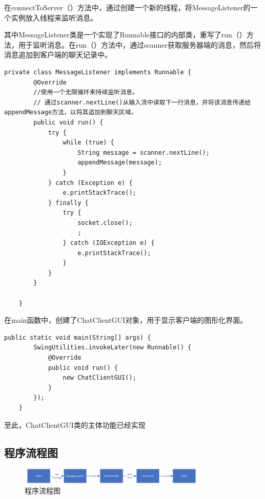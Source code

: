 \documentclass[UTF8,12pt]{article}
\begin{document}
在connectToServer（）方法中，通过创建一个新的线程，将MessageListener的一个实例放入线程来监听消息。

其中MessageListener类是一个实现了Runnable接口的内部类，重写了run（）方法，用于监听消息。在run（）方法中，通过scanner获取服务器端的消息，然后将消息追加到客户端的聊天记录中。
\begin{lstlisting}[title=MessageListener类的实现,frame=shadowbox]
    private class MessageListener implements Runnable {
        @Override
        //使用一个无限循环来持续监听消息。
        // 通过scanner.nextLine()从输入流中读取下一行消息，并将该消息传递给appendMessage方法，以将其追加到聊天区域。
        public void run() {
            try {
                while (true) {
                    String message = scanner.nextLine();
                    appendMessage(message);
                }
            } catch (Exception e) {
                e.printStackTrace();
            } finally {
                try {
                    socket.close();
                    ;
                } catch (IOException e) {
                    e.printStackTrace();
                }
            }
        }

    }

\end{lstlisting}

在main函数中，创建了ChatClientGUI对象，用于显示客户端的图形化界面。

\begin{lstlisting}[title=main函数,frame=shadowbox]
    public static void main(String[] args) {
        SwingUtilities.invokeLater(new Runnable() {
            @Override
            public void run() {
                new ChatClientGUI();
            }
        });
    }
\end{lstlisting}

至此，ChatClientGUI类的主体功能已经实现

\subsection{程序流程图}

\begin{figure}[htbp]
    \centering
    \includegraphics[width=0.8\textwidth]{img/1.png}
    \caption{程序流程图}
\end{figure}

\newpage
\end{document}
